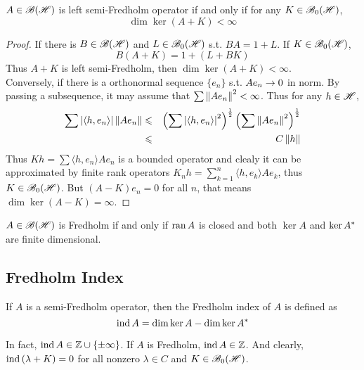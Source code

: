 \begin{thm}
	$A \in \mathscr{B(H)}$ is left semi-Fredholm operator if and only if for any $K \in \mathscr{B}_{0}\mathscr{(H)}$,
	\begin{equation*}
		\dim{\ker{(A+K)}} < \infty
	\end{equation*}
\end{thm}
\begin{proof}
	If there is $B \in \mathscr{B(H)}$ and $L \in \mathscr{B}_{0}\mathscr{(H)}$ s.t. $BA = 1+L$. If $K \in \mathscr{B}_{0}\mathscr{(H)}$, 
	\begin{equation*}
		B(A+K) = 1 + (L + BK)
	\end{equation*}
	Thus $A+K$ is left semi-Fredholm, then $\dim{\ker{(A+K)}} < \infty$.\\
	Conversely, if there is a orthonormal sequence $\{e_n\}$ s.t. $Ae_n \rightarrow 0$ in norm. By passing a subsequence, it may assume that $\sum \left\lVert Ae_n\right\lVert^2 < \infty$. Thus for any $h \in \mathscr{H}$, 
	\begin{eqnarray*}
		\sum \left\lvert\langle h,e_n \rangle\right\lvert\left\lVert Ae_n\right\lVert &\leqslant& \left(\sum \left\lvert\langle h,e_n \rangle\right\lvert^2\right)^{\frac{1}{2}}\left(\sum \left\lVert Ae_n\right\lVert^2\right)^{\frac{1}{2}} \\
		&\leqslant& C\left\lVert h\right\lVert
	\end{eqnarray*}
	Thus $Kh = \sum \langle h,e_n \rangle Ae_n$ is a bounded operator and clealy it can be approximated by finite rank operators $K_nh=\sum_{k=1}^n \langle h,e_k \rangle Ae_k$, thus $K \in \mathscr{B}_{0}\mathscr{(H)}$. But $(A-K)e_n = 0$ for all $n$, that means $\dim{\ker{(A-K)}} = \infty$.
\end{proof}

\begin{cor}
	$A \in \mathscr{B(H)}$ is Fredholm if and only if $\operatorname{ran}{A}$ is closed and both $\ker{A}$ and $\ker{A^{*}}$ are finite dimensional.
\end{cor}

\subsection{Fredholm Index}

\begin{defn}
	If $A$ is a semi-Fredholm operator, then the Fredholm index of $A$ is defined as
	\begin{equation*}
		\operatorname{ind}{A} = \dim{\ker{A}} - \dim{\ker{A^{*}}}
	\end{equation*}
\end{defn}
\begin{rem}
	In fact, $\operatorname{ind}{A} \in \mathbb{Z} \cup \{\pm \infty\}$. If $A$ is Fredholm, $\operatorname{ind}{A} \in \mathbb{Z}$. And clearly, $\operatorname{ind}{(\lambda+K)} = 0$ for all nonzero $\lambda \in C$ and $K \in \mathscr{B}_{0}\mathscr{(H)}$.
\end{rem}

